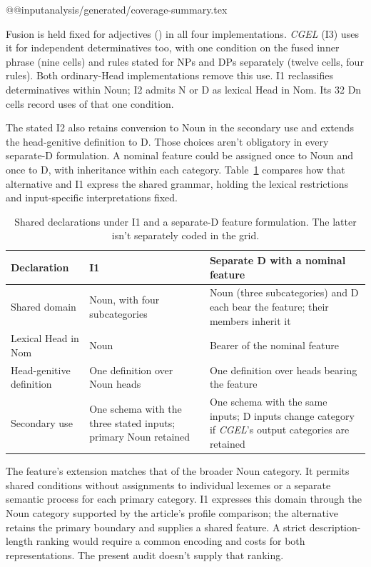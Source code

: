\documentclass[12pt]{article}
\makeatletter
\newcommand{\tablebody}[1]{\csname @@input\endcsname #1 }
\makeatother
\begin{document}
\tablebody{analysis/generated/coverage-summary.tex}

Fusion is held fixed for adjectives () in all four implementations. \textit{CGEL} (I3) uses it for independent determinatives too, with one condition on the fused inner phrase (nine cells) and rules stated for NPs and DPs separately (twelve cells, four rules). Both ordinary-Head implementations remove this use. I1 reclassifies determinatives within Noun; I2 admits N or D as lexical Head in Nom. Its 32 Dn cells record uses of that one condition.

The stated I2 also retains conversion to Noun in the secondary use and extends the head-genitive definition to D. Those choices aren't obligatory in every separate-D formulation. A nominal feature could be assigned once to Noun and once to D, with inheritance within each category. Table~\ref{tab:feature-alternative} compares how that alternative and I1 express the shared grammar, holding the lexical restrictions and input-specific interpretations fixed.

\begin{table}[H]\centering\small
\caption{Shared declarations under I1 and a separate-D feature formulation. The latter isn't separately coded in the grid.}\label{tab:feature-alternative}
\begin{tabular}{>{\raggedright\arraybackslash}p{3.2cm}>{\raggedright\arraybackslash}p{4.4cm}>{\raggedright\arraybackslash}p{4.4cm}}
\toprule
Declaration & I1 & Separate D with a nominal feature \\
\midrule
Shared domain & Noun, with four subcategories & Noun (three subcategories) and D each bear the feature; their members inherit it \\
Lexical Head in Nom & Noun & Bearer of the nominal feature \\
Head-genitive definition & One definition over Noun heads & One definition over heads bearing the feature \\
Secondary use & One schema with the three stated inputs; primary Noun retained & One schema with the same inputs; D inputs change category if \textit{CGEL}'s output categories are retained \\
\bottomrule
\end{tabular}
\end{table}

The feature's extension matches that of the broader Noun category. It permits shared conditions without assignments to individual lexemes or a separate semantic process for each primary category. I1 expresses this domain through the Noun category supported by the article's profile comparison; the alternative retains the primary boundary and supplies a shared feature. A strict description-length ranking would require a common encoding and costs for both representations. The present audit doesn't supply that ranking.
\end{document}
